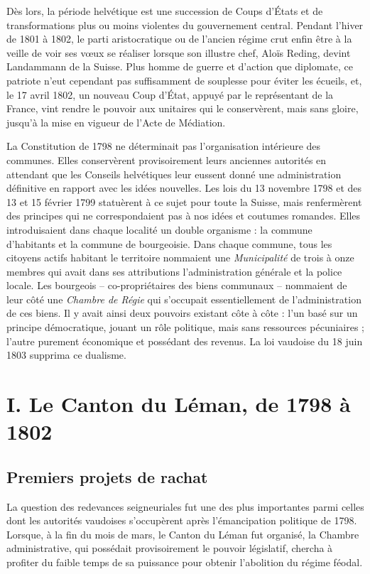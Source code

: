 \documentclass[french,twoside]{book} %
\newcommand\chapteropen{} %
\newcommand\chaptercont{} %
\newcommand\chapterclose{} %
\begin{document}
Dès lors, la période helvétique est une succession de Coups d’États et de transformations plus ou moins violentes du gouvernement central. Pendant l’hiver de 1801 à 1802, le parti aristocratique ou de l’ancien régime crut enfin être à la veille de voir ses vœux se réaliser lorsque son illustre chef, Aloïs Reding, devint Landammann de la Suisse. Plus homme de guerre et d’action que diplomate, ce patriote n’eut cependant pas suffisamment de souplesse pour éviter les écueils, et, le 17 avril 1802, un nouveau Coup d’État, appuyé par le représentant de la France, vint rendre le pouvoir aux unitaires qui le conservèrent, mais sans gloire, jusqu’à la mise en vigueur de l’Acte de Médiation.\par
La Constitution de 1798 ne déterminait pas l’organisation intérieure des communes. Elles conservèrent provisoirement leurs anciennes autorités en attendant que les Conseils helvétiques leur eussent donné une administration définitive en rapport avec les idées nouvelles. Les lois du 13 novembre 1798 et des 13 et 15 février 1799 statuèrent à ce sujet pour toute la Suisse, mais renfermèrent des principes qui ne correspondaient pas à nos idées et coutumes romandes. Elles introduisaient dans chaque localité un double organisme : la commune d’habitants et la commune de bourgeoisie. Dans chaque commune, tous les citoyens actifs habitant le territoire nommaient une \emph{Municipalité} de trois à onze membres qui avait dans ses attributions l’administration générale et la police locale. Les bourgeois – co-propriétaires des biens communaux – nommaient de leur côté une \emph{Chambre de Régie} qui s’occupait essentiellement de l’administration de ces biens. Il y avait ainsi deux pouvoirs existant côte à côte : l’un basé sur un principe démocratique, jouant un rôle politique, mais sans ressources pécuniaires ; l’autre purement économique et possédant des revenus. La loi vaudoise du 18 juin 1803 supprima ce dualisme.
\chapterclose


\chapteropen
\chapter[I. Le Canton du Léman, de 1798 à 1802]{I. Le Canton du Léman, de 1798 à 1802}

\chaptercont
\section[Premiers projets de rachat]{Premiers projets de rachat}
\noindent La question des redevances seigneuriales fut une des plus importantes parmi celles dont les autorités vaudoises s’occupèrent après l’émancipation politique de 1798. Lorsque, à la fin du mois de mars, le Canton du Léman fut organisé, la Chambre administrative, qui possédait provisoirement le pouvoir législatif, chercha à profiter du faible temps de sa puissance pour obtenir l’abolition du régime féodal.\par
\end{document}
